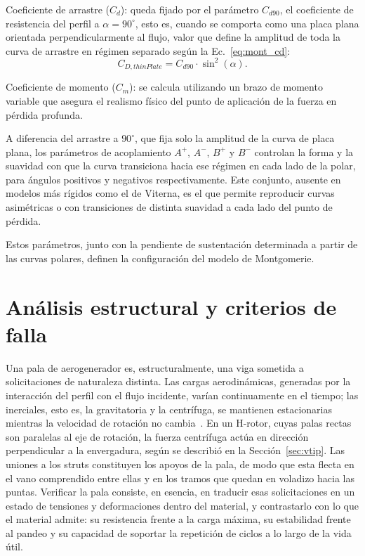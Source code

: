 Coeficiente de arrastre ($C_d$): queda fijado por el parámetro $C_{d90}$, el coeficiente de resistencia del perfil a $\alpha = 90^\circ$, esto es, cuando se comporta como una placa plana orientada perpendicularmente al flujo, valor que define la amplitud de toda la curva de arrastre en régimen separado según la Ec.~\ref{eq:mont_cd}:
\begin{equation}
C_{D, thinPlate} = C_{d90} \cdot \sin^2(\alpha).
\label{eq:mont_cd}
\end{equation}

Coeficiente de momento ($C_m$): se calcula utilizando un brazo de momento variable que asegura el realismo físico del punto de aplicación de la fuerza en pérdida profunda.

A diferencia del arrastre a $90^\circ$, que fija solo la amplitud de la curva de placa plana, los parámetros de acoplamiento $A^+$, $A^-$, $B^+$ y $B^-$ controlan la forma y la suavidad con que la curva transiciona hacia ese régimen en cada lado de la polar, para ángulos positivos y negativos respectivamente. Este conjunto, ausente en modelos más rígidos como el de Viterna, es el que permite reproducir curvas asimétricas o con transiciones de distinta suavidad a cada lado del punto de pérdida.

Estos parámetros, junto con la pendiente de sustentación determinada a partir de las curvas polares, definen la configuración del modelo de Montgomerie.

\section{Análisis estructural y criterios de falla}
\label{sec:analisis-estructural}

Una pala de aerogenerador es, estructuralmente, una viga sometida a solicitaciones de naturaleza distinta. Las cargas aerodinámicas, generadas por la interacción del perfil con el flujo incidente, varían continuamente en el tiempo; las inerciales, esto es, la gravitatoria y la centrífuga, se mantienen estacionarias mientras la velocidad de rotación no cambia~\parencite{Galinos2015}. En un H-rotor, cuyas palas rectas son paralelas al eje de rotación, la fuerza centrífuga actúa en dirección perpendicular a la envergadura, según se describió en la Sección~\ref{sec:vtip}. Las uniones a los struts constituyen los apoyos de la pala, de modo que esta flecta en el vano comprendido entre ellas y en los tramos que quedan en voladizo hacia las puntas. Verificar la pala consiste, en esencia, en traducir esas solicitaciones en un estado de tensiones y deformaciones dentro del material, y contrastarlo con lo que el material admite: su resistencia frente a la carga máxima, su estabilidad frente al pandeo y su capacidad de soportar la repetición de ciclos a lo largo de la vida útil.

